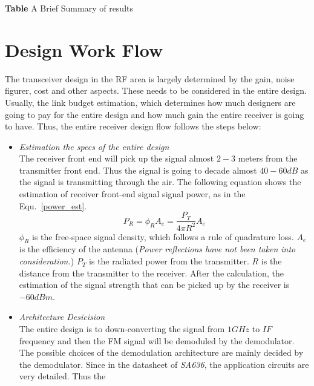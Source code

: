 \documentclass[]{article}
\begin{document}
\begin{center}
    \textbf{Table} A Brief Summary of results
\end{center}

\section{Design Work Flow}
The transceiver design in the RF area is largely determined by the gain, noise
figurer, cost and other aspects. These needs to be considered in the entire
design. Usually, the link budget estimation, which determines how much designers
are going to pay for the entire design and how much gain the entire receiver is
going to have.
Thus, the entire receiver design flow follows the steps below:
    \begin{itemize}
        \item \textit{Estimation the specs of the entire design} \\
            The receiver front end will pick up the signal almost $2-3$ meters
            from the transmitter front end. Thus the signal is going to decade
            almost $40-60dB$ as the signal is transmitting through the air. The
            following equation shows the estimation of receiver front-end signal
            signal power, as in the Equ.~\ref{power_est}.
            \begin{equation}
                P_{R} = \phi_{R}A_{e}=\frac{P_{T}}{4\pi R^2}A_{e}
                \label{power_est}
            \end{equation}
            $\phi_{R}$ is the free-space signal density, which follows a rule of
            quadrature loss. $A_{e}$ is the efficiency of the antenna
            (\textit{Power reflections have not been taken into consideration.})
            $P_{T}$ is the radiated power from the transmitter. $R$ is the
            distance from the transmitter to the receiver. After the
            calculation, the estimation of the signal strength that can be
            picked up by the receiver is $-60dBm$.
        \item \textit{Architecture Desicision} \\
            The entire design is to down-converting the signal from $1GHz$ to
            $IF$ frequency and then the FM signal will be demoduled by the
            demodulator. The possible choices of the demodulation architecture
            are mainly decided by the demodulator. Since in the datasheet of
            \textit{SA636}, the application circuits are very detailed. Thus the

\end{itemize}
\end{document}
